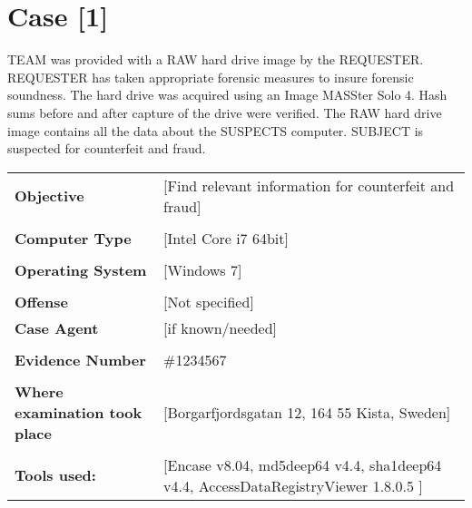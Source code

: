 \setlength\headsep{10pt}
\section{Case [1]}

TEAM was provided with a RAW hard drive image by the REQUESTER. 
REQUESTER has taken appropriate forensic measures to insure forensic soundness. The hard drive was acquired
using an Image MASSter Solo 4. Hash sums before and after capture of the drive were verified.
The RAW hard drive image contains all the data about the SUSPECTS computer.
SUBJECT is suspected for counterfeit and fraud.  


\begin{longtable}{p{}p{}}
\textbf{Objective} & [Find relevant information for counterfeit and fraud]\\
&\\
\textbf{Computer Type} & [Intel Core i7 64bit]\\
&\\
\textbf{Operating System} & [Windows 7]\\
&\\
\textbf{Offense} & [Not specified]\\
\textbf{Case Agent} & [if known/needed]\\
&\\
\textbf{Evidence Number} &  \#1234567\\
&\\
\textbf{Where examination took place} &  [Borgarfjordsgatan 12, 164 55 Kista, Sweden] \\
&\\
\textbf{Tools used:} & [Encase v8.04, md5deep64 v4.4, sha1deep64 v4.4, AccessDataRegistryViewer 1.8.0.5
			]  
\end{longtable}

\newpage
